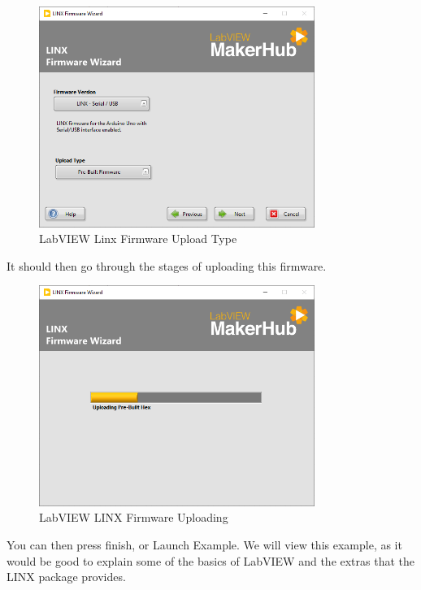 \documentclass[a4paper,11pt]{report}
\begin{document}
\begin{figure}[H]
\centering
\includegraphics[width=0.8\textwidth]{screenshots/labviewarduino4}
\caption{LabVIEW Linx Firmware Upload Type}
\end{figure}

It should then go through the stages of uploading this firmware.

\begin{figure}[H]
\centering
\includegraphics[width=0.8\textwidth]{screenshots/labviewarduino5}
\caption{LabVIEW LINX Firmware Uploading}
\end{figure}

You can then press finish, or Launch Example. We will view this example, as it would be good to explain some of the basics of LabVIEW and the extras that the LINX package provides.
\end{document}
